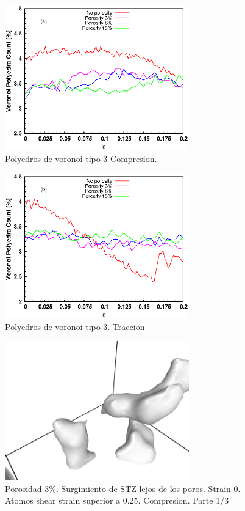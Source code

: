\documentclass[10pt, oneside]{article} %
\begin{document}

\begin{figure}[H]
\centering
\includegraphics[width=8cm]{Figures/Porosidad/porosity_tipe3_strain_comp.eps}
\caption{Polyedros de voronoi tipo 3 Compresion.}
\end{figure}

\begin{figure}[H]
\centering
\includegraphics[width=8cm]{Figures/Porosidad/porosity_tipe3_strain_tens.eps}
\caption{Polyedros de voronoi tipo 3. Traccion}
\end{figure}

\begin{figure}[H]
\centering
\includegraphics[width=8cm]{Figures/Porosidad/porosidad_STZObservation_3_0.png}
\caption{Porosidad 3\%. Surgimiento de STZ lejos de los poros. Strain 0. Atomos shear strain superior a 0.25. Compresion. Parte 1/3}
\end{figure}
\end{document}
